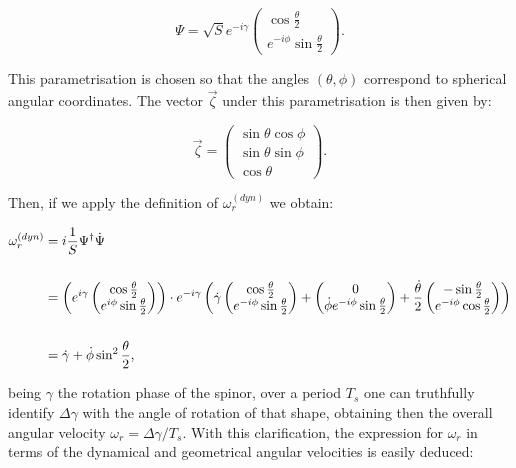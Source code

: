 \begin{equation*}
\Psi = \sqrt{S}e^{-i\gamma} \begin{pmatrix}\cos{\frac{\theta}{2}}\\
e^{-i\phi}\sin{\frac{\theta}{2}}\end{pmatrix}.
\end{equation*}

This parametrisation is chosen so that the angles $(\theta,\phi)$ correspond to spherical angular coordinates. The vector $\vec{\zeta}$ under this parametrisation is then given by:

\begin{equation*}
\vec{\zeta} = \begin{pmatrix} \sin{\theta}\cos{\phi}\\ \sin{\theta}\sin{\phi}\\ \cos{\theta} \end{pmatrix}.
\end{equation*}

Then, if we apply the definition of $\omega_r^{(dyn)}$ we obtain:

\begin{align*}
\omega_r^{(dyn)} &= i\frac{1}{S}\Psi^\dagger\dot{\Psi} \\
\\
&= \left( e^{i\gamma}\begin{pmatrix}\cos{\frac{\theta}{2}} \\e^{i\phi}\sin{\frac{\theta}{2}}\end{pmatrix} \right)\cdot e^{-i\gamma}\left( \dot{\gamma}\begin{pmatrix}\cos{\frac{\theta}{2}} \\e^{-i\phi}\sin{\frac{\theta}{2}}\end{pmatrix}+ \begin{pmatrix}0 \\ \dot{\phi}e^{-i\phi}\sin{\frac{\theta}{2}}\end{pmatrix} + \frac{\dot{\theta}}{2}\begin{pmatrix}-\sin{\frac{\theta}{2}} \\e^{-i\phi}\cos{\frac{\theta}{2}}\end{pmatrix} \right)\\
\\
&= \dot{\gamma}+\dot{\phi}\sin^2{\frac{\theta}{2}},
\end{align*}

being $\gamma$ the rotation phase of the spinor, over a period $T_s$ one can truthfully identify $\Delta \gamma$ with the angle of rotation of that shape, obtaining then the overall angular velocity $\omega_r = \Delta \gamma /T_s$. With this clarification, the expression for $\omega_r$ in terms of the dynamical and geometrical angular velocities is easily deduced:

